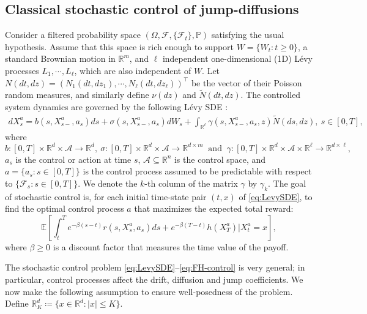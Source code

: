 \documentclass[11pt]{article}
\newcommand{\1}{\mathbbm{1}}
\begin{document}
\subsection{Classical stochastic control of jump-diffusions}
Consider a filtered probability space $(\Omega,\mathcal{F},\{\mathcal{F}_t\},\mathbb{P})$ satisfying the usual hypothesis. Assume that this space is rich enough to support $W = \{W_t : t \ge 0\}$, a standard Brownian motion in $\mathbb{R}^m$, and $\ell$ independent one-dimensional (1D) L\'evy processes $L_1,\cdots,L_{\ell}$, which are also independent of $W$. Let $N(dt,dz)=(N_1(dt,dz_1),\cdots,N_{\ell}(dt,dz_\ell))^\top$ be the vector of their Poisson random measures, and similarly define $\nu(dz)$ and $\widetilde{N}(dt,dz)$. The controlled system dynamics are governed by the following L{\'e}vy SDE \cite[Chapter 3]{oksendal2007applied}:
\begin{align} \label{eq:LevySDE}
dX_s^a = b(s, X_{s-}^a, a_s)ds + \sigma(s, X_{s-}^a, a_s)dW_s + \int_{\mathbb{R}^\ell}\gamma(s, X_{s-}^a, a_{s}, z) \widetilde{N}(ds, dz),\ s \in [0, T],
\end{align}
where
\begin{equation}
	b: [0,T]\times \mathbb{R}^d \times \mathcal{A} \rightarrow \mathbb{R}^d,\ \sigma: [0,T]\times \mathbb{R}^d \times \mathcal{A} \rightarrow \mathbb{R}^{d \times m} \ \text { and } \ \gamma: [0,T]\times \mathbb{R}^d \times \mathcal{A} \times \mathbb{R}^\ell \rightarrow \mathbb{R}^{d \times \ell},
\end{equation}
$a_s$ is the control or action at time $s$, $\mathcal{A}\subseteq\mathbb{R}^n$ is the control space, and $a=\{a_s: s\in[0,T]\}$ is the control process assumed to be predictable with respect to $\{\mathcal{F}_s: s\in [0,T]\}$. We denote the $k$-th column of the matrix $\gamma$ by $\gamma_k$.
The goal of stochastic control is, for each initial time-state pair $(t, x)$ of \eqref{eq:LevySDE}, to find the optimal control process $a$ that maximizes the expected total reward:
\begin{equation} \label{eq:FH-control}
 \mathbb{E} \left[ \int_t^T e^{-\beta(s-t) }r(s, X_s^a, a_s) ds + e^{-\beta(T-t) } h (X_T^a) \Big| X_t^a =x \right],
\end{equation}
where $\beta \ge 0$ is a discount factor that measures the time value of the payoff.

The stochastic control problem \eqref{eq:LevySDE}--\eqref{eq:FH-control} is very general; in particular, control processes affect the drift, diffusion and jump coefficients.
We now make the following assumption to ensure well-posedness of the problem. Define $\mathbb{R}^d_K\coloneqq\{x\in\mathbb{R}^d: |x|\leq K\}$.
\end{document}

